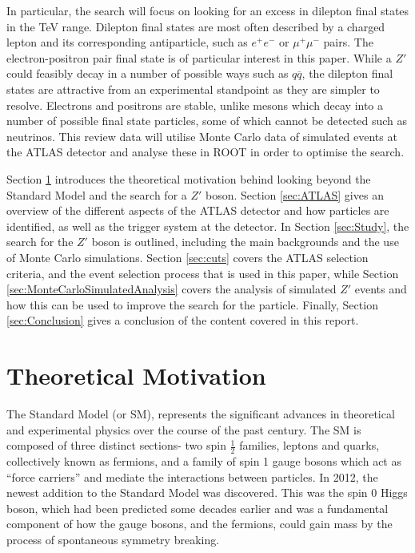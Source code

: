 \documentclass{article}
\begin{document}
In particular, the search will focus on looking for an excess in dilepton final states in the TeV range. Dilepton final states are most often described by a charged lepton and its corresponding antiparticle, such as $e^+e^-$ or $\mu^+\mu^-$ pairs. The electron-positron pair final state is of particular interest in this paper. While a $Z'$ could feasibly decay in a number of possible ways such as $q\overline{q}$, the dilepton final states are attractive from an experimental standpoint as they are simpler to resolve. Electrons and positrons are stable, unlike mesons which decay into a number of possible final state particles, some of which cannot be detected such as neutrinos. This review data will utilise Monte Carlo data of simulated events at the ATLAS detector and analyse these in ROOT \cite{ROOT} in order to optimise the search.

Section \ref{sec:TheoreticalMotication} introduces the theoretical motivation behind looking beyond the Standard Model and the search for a $Z'$ boson. Section \ref{sec:ATLAS} gives an overview of the different aspects of the ATLAS detector and how particles are identified, as well as the trigger system at the detector. In Section \ref{sec:Study}, the search for the $Z'$ boson is outlined, including the main backgrounds and the use of Monte Carlo simulations. Section \ref{sec:cuts} covers the ATLAS selection criteria, and the event selection process that is used in this paper, while Section \ref{sec:MonteCarloSimulatedAnalysis} covers the analysis of simulated $Z'$ events and how this can be used to improve the search for the particle. Finally, Section \ref{sec:Conclusion} gives a conclusion of the content covered in this report.



\section{Theoretical Motivation}%
\label{sec:TheoreticalMotication}

The Standard Model (or SM), represents the significant advances in theoretical and experimental physics over the course of the past century. The SM is composed of three distinct sections- two spin $\frac{1}{2}$ families, leptons and quarks, collectively known as fermions, and a family of spin 1 gauge bosons which act as ``force carriers'' and mediate the interactions between particles. In 2012, the newest addition to the Standard Model was discovered. This was the spin 0 Higgs boson, which had been predicted some decades earlier and was a fundamental component of how the gauge bosons, and the fermions, could gain mass by the process of spontaneous symmetry breaking. 
\end{document}
